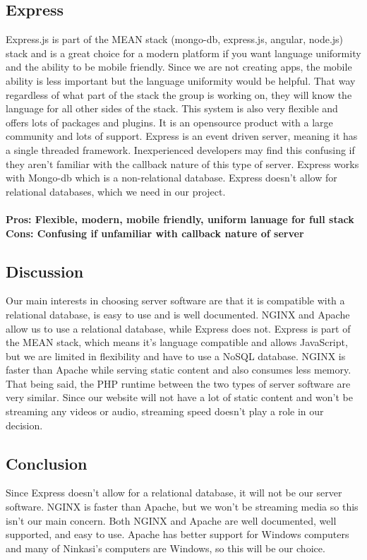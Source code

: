 \documentclass[draftclsnofoot,onecolumn,letterpaper,10pt,compsoc]{IEEEtran}
\begin{document}
	\subsection{Express}
		Express.js is part of the MEAN stack (mongo-db, express.js, angular, node.js) stack and is a great choice for a modern platform if you want language uniformity and the ability to be mobile friendly\cite{UpWork}.
		Since we are not creating apps, the mobile ability is less important but the language uniformity would be helpful.
		That way regardless of what part of the stack the group is working on, they will know the language for all other sides of the stack.
		This system is also very flexible and offers lots of packages and plugins.
		It is an opensource product with a large community and lots of support\cite{JSSolutionsDev}.
		Express is an event  driven server, meaning it has a single threaded framework\cite{JSSolutionsDev}.
		Inexperienced developers may find this confusing if they aren't familiar with the callback nature of this type of server\cite{JSSolutionsDev}.
		Express works with Mongo-db which is a non-relational database. Express doesn’t allow for relational databases, which we need in our project.
		\\ \\
		\textbf{Pros: Flexible, modern, mobile friendly, uniform lanuage for full stack}
		\\
		\textbf{Cons: Confusing if unfamiliar with callback nature of server}

		\subsection{Discussion}
		Our main interests in choosing server software are that it is compatible with a relational database, is easy to use and is well documented.
		NGINX and Apache allow us to use a relational database, while Express does not.
		Express is part of the MEAN stack, which means it’s language compatible and allows JavaScript, but we are limited in flexibility and have to use a NoSQL database.
		NGINX is faster than Apache while serving static content and also consumes less memory. That being said, the PHP runtime between the two types of server software are very similar\cite{HostingAd}.
		Since our website will not have a lot of static content and won’t be streaming any videos or audio, streaming speed doesn’t play a role in our decision.
		\subsection{Conclusion}
		Since Express doesn’t allow for a relational database, it will not be our server software.
		NGINX is faster than Apache, but we won’t be streaming media so this isn’t our main concern.
		Both NGINX and Apache are well documented, well supported, and easy to use.
		Apache has better support for Windows computers and many of Ninkasi’s computers are Windows, so this will be our choice.
\end{document}
